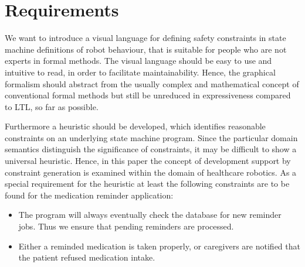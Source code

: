\documentclass[conference]{IEEEtran}
\begin{document}



\section{Requirements}
\label{sec:requirements}


We want to introduce a visual language for defining safety constraints in state machine definitions of robot behaviour, that is suitable for people who are not experts in formal methods. The visual language should be easy to use and intuitive to read, in order to facilitate maintainability.
Hence, the graphical formalism should abstract from the usually complex and mathematical concept of conventional formal methods but still be unreduced in expressiveness compared to LTL, so far as possible.
 
Furthermore a heuristic should be developed, which identifies reasonable constraints on an underlying state machine program. 
Since the particular domain semantics distinguish the significance of constraints, it may be difficult to show a universal heuristic. Hence, in this paper the concept of development support by constraint generation is examined within the domain of healthcare robotics. As a special requirement for the heuristic at least the following constraints are to be found for the medication reminder application:

\begin{itemize}
	\item The program will always eventually check the database for new reminder jobs. Thus we ensure that pending reminders are processed.
	\item Either a reminded medication is taken properly, or caregivers are notified that the patient refused medication intake.
\end{itemize}
\end{document}
